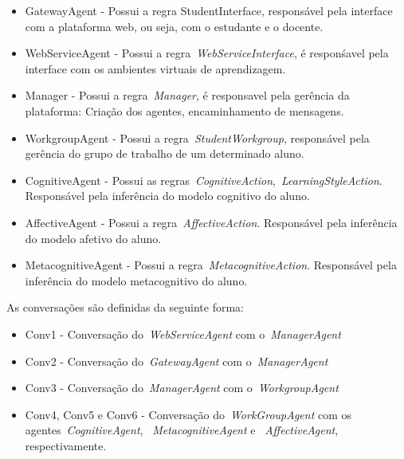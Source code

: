 \begin{itemize}
	\item GatewayAgent - Possui a regra StudentInterface, responsável pela interface com a plataforma web, ou seja, com o estudante e o docente.
	\item WebServiceAgent - Possui a regra~\emph{WebServiceInterface}, é responśavel pela interface com os ambientes virtuais de aprendizagem.
	\item Manager - Possui a regra~\emph{Manager}, é responsavel pela gerência da plataforma: Criação dos agentes, encaminhamento de mensagens.
	\item WorkgroupAgent - Possui a regra~\emph{StudentWorkgroup}, responsável pela gerência do grupo de trabalho de um determinado aluno.
	\item CognitiveAgent - Possui as regras~\emph{CognitiveAction},~\emph{LearningStyleAction}. Responsável pela inferência do modelo cognitivo do aluno.
	\item AffectiveAgent - Possui a regra~\emph{AffectiveAction}. Responsável pela inferência do modelo afetivo do aluno.
	\item MetacognitiveAgent - Possui a regra~\emph{MetacognitiveAction}. Responsável pela inferência do modelo metacognitivo do aluno.
\end{itemize}

As conversações são definidas da seguinte forma:
\begin{itemize}
	\item Conv1 - Conversação do~\emph{WebServiceAgent} com o~\emph{ManagerAgent}
	\item Conv2 - Conversação do~\emph{GatewayAgent} com o~\emph{ManagerAgent}
	\item Conv3 - Conversação do~\emph{ManagerAgent} com o~\emph{WorkgroupAgent}
	\item Conv4, Conv5 e Conv6 - Conversação do~\emph{WorkGroupAgent} com os agentes~\emph{CognitiveAgent}, ~\emph{MetacognitiveAgent} e ~\emph{AffectiveAgent}, respectivamente.
\end{itemize}


